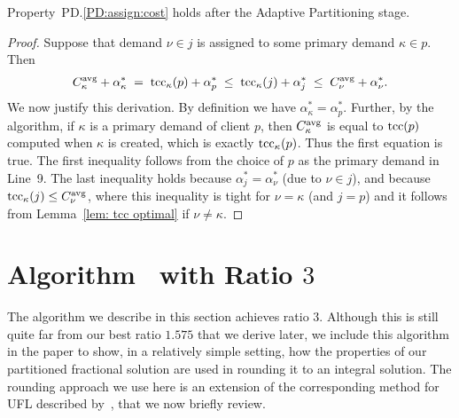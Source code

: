 \documentclass[11pt]{article}
\begin{document}

\begin{lemma}\label{lem: PD:assign:cost holds}
Property~PD.\ref{PD:assign:cost} holds after the Adaptive Partitioning stage.
\end{lemma}

\begin{proof}
Suppose that demand $\nu\in j$ is assigned to some primary demand $\kappa\in p$.
Then
%
\begin{eqnarray*}
 C^{{\mbox{\scriptsize\rm avg}}}_{\kappa} + \alpha_{\kappa}^\ast \;=\; \textrm{tcc}_\kappa(p) + \alpha^\ast_p
 					\;\le\; \textrm{tcc}_\kappa(j) + \alpha^\ast_j   
					\;\le\; C^{{\mbox{\scriptsize\rm avg}}}_{\nu} + \alpha^\ast_\nu.
\end{eqnarray*}
%
We now justify this derivation. By definition we have
$\alpha_{\kappa}^\ast = \alpha^\ast_p$.  Further, by the
algorithm, if $\kappa$ is a primary demand of client $p$,
then $C^{{\mbox{\scriptsize\rm avg}}}_{\kappa}$ is equal to $\textrm{tcc}(p)$ computed when
$\kappa$ is created, which is exactly $\textrm{tcc}_\kappa(p)$. Thus
the first equation is true. The first inequality follows
from the choice of $p$ as the primary demand in Line~9.  
The last
inequality holds because $\alpha^\ast_j = \alpha^\ast_\nu$ (due to $\nu\in j$),
and because $\textrm{tcc}_\kappa(j) \le C^{{\mbox{\scriptsize\rm avg}}}_{\nu}$, where this
inequality is tight for $\nu = \kappa$ (and $j=p$) and it follows from
Lemma~\ref{lem: tcc optimal} if $\nu\neq\kappa$.
\end{proof}



\section{Algorithm~{\EGUP} with Ratio $3$}
\label{sec: 3-approximation}

The algorithm we describe in this section achieves ratio
$3$. Although this is still quite far from our best ratio $1.575$ that
we derive later, we include this algorithm in the paper to show,
in a relatively simple setting, how the properties of our partitioned fractional
solution are used in rounding it to an integral solution.
The rounding approach we use here is an extension of the corresponding
method for UFL described by~\cite{gupta08}, that we now briefly review. 
\end{document}
